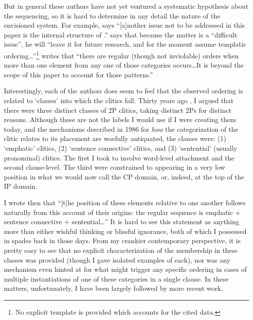 \documentclass[output=paper,
modfonts
]{LSP/langsci}
\begin{document}
But in general these authors have not yet ventured a systematic hypothesis about
the sequencing, so it is hard to determine in any detail the nature of the envisioned system.
For example, \citet[108, fn.\ 3]{keydana2011} says ``[a]nother issue not to be
addressed in this paper is the internal structure of .'' \citet[88]{goldstein2016} says that because
the matter is a ``difficult issue'', he will ``leave it for future research, and for
the moment assume templatic ordering\ldots ''\footnote{No explicit template is provided which accounts
for the cited data.} \citet[28]{lowe2014}
writes that ``there are regular (though not inviolable) orders when more than one element from
any one of those categories occurs\ldots It is beyond the scope of this paper to account for
those patterns.''

Interestingly, each of the authors does seem to feel that the observed ordering is
related to `classes' into which the clitics fall. Thirty years ago \citep[73]{hale1987}, I argued that
there were three distinct classes of 2P clitics, taking distinct 2Ps for distinct reasons. 
Although these are not the labels I would use if I were creating them today, and the mechanisms described in 1986
for \textit{how} the categorization of the clitic relates to its placement are woefully antiquated,
the classes were: (1) `emphatic' clitics, (2) `sentence connective' clitics, and (3) `sentential'
(usually pronominal) clitics. The first I took to involve word-level attachment and the second clause-level. The third
were constrained to appearing in a very low position in what we would now call the CP domain, or,
indeed, at the top of the IP domain. 

I wrote then that ``[t]he position of these elements relative to one
another follows naturally from this account of their origins: the regular sequence is emphatic $+$ 
sentence connective $+$ sentential\ldots '' It is hard to see this statement as anything more than 
either wishful thinking or blissful ignorance, both of which I possessed in spades back in those
days. From my crankier contemporary perspective, it is pretty easy to see that no explicit 
characterization of the membership in
these classes was provided (though I gave isolated examples of each), nor was any mechanism even 
hinted at for what might trigger any
specific ordering in cases of multiple instantiations of one of these categories in a single
clause. In these matters, unfortunately,
I have been largely followed by more recent work. 
\end{document}
